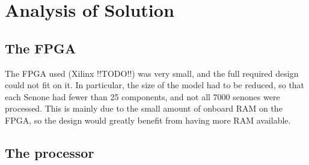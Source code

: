 \section{Analysis of Solution} %
\label{sec:analysis_of_solution}

	\subsection{The FPGA} %
	\label{sub:the_fpga}
		The FPGA used (Xilinx !!TODO!!) was very small, and the full required design could not fit on it.  In particular, the size of the model had to be reduced, so that each Senone had fewer than 25 components, and not all 7000 senones were processed.  This is mainly due to the small amount of onboard RAM on the FPGA, so the design would greatly benefit from having more RAM available.



	\subsection{The processor} %
	\label{sub:the_processor}





